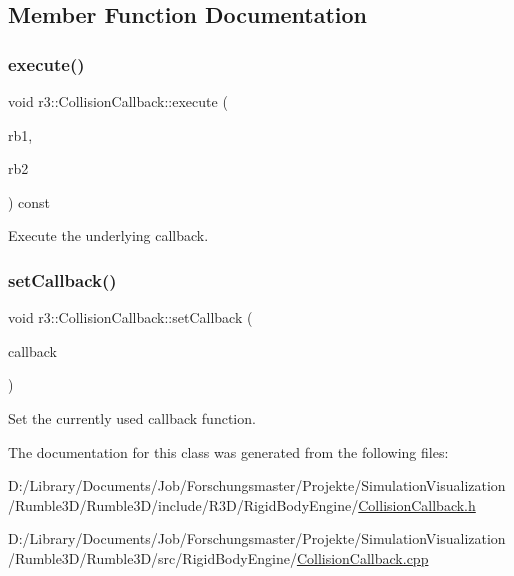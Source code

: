 \subsection{Member Function Documentation}
\mbox{\label{classr3_1_1_collision_callback_afe734fe9303efadfdd6c1abc3910c432}} 
\subsubsection{\texorpdfstring{execute()}{execute()}}
{\footnotesize\ttfamily void r3\+::\+Collision\+Callback\+::execute (\begin{DoxyParamCaption}\item[{\mbox{\hyperlink{classr3_1_1_rigid_body}{Rigid\+Body}} $\ast$}]{rb1,  }\item[{\mbox{\hyperlink{classr3_1_1_rigid_body}{Rigid\+Body}} $\ast$}]{rb2 }\end{DoxyParamCaption}) const}



Execute the underlying callback. 

\mbox{\label{classr3_1_1_collision_callback_ab6a33e6f074ebd6860f396c3b0a78423}} 
\subsubsection{\texorpdfstring{set\+Callback()}{setCallback()}}
{\footnotesize\ttfamily void r3\+::\+Collision\+Callback\+::set\+Callback (\begin{DoxyParamCaption}\item[{const \mbox{\hyperlink{classr3_1_1_collision_callback_afcd5494eafdbd1a0956589b6ec9c0728}{Callback}} \&}]{callback }\end{DoxyParamCaption})}



Set the currently used callback function. 



The documentation for this class was generated from the following files\+:\begin{DoxyCompactItemize}
\item 
D\+:/\+Library/\+Documents/\+Job/\+Forschungsmaster/\+Projekte/\+Simulation\+Visualization/\+Rumble3\+D/\+Rumble3\+D/include/\+R3\+D/\+Rigid\+Body\+Engine/\mbox{\hyperlink{_collision_callback_8h}{Collision\+Callback.\+h}}\item 
D\+:/\+Library/\+Documents/\+Job/\+Forschungsmaster/\+Projekte/\+Simulation\+Visualization/\+Rumble3\+D/\+Rumble3\+D/src/\+Rigid\+Body\+Engine/\mbox{\hyperlink{_collision_callback_8cpp}{Collision\+Callback.\+cpp}}\end{DoxyCompactItemize}
